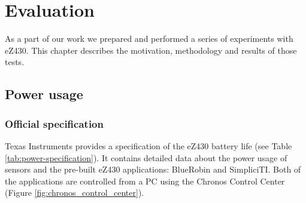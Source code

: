 \chapter{Evaluation}

As a part of our work we prepared and performed a series of experiments with eZ430.
This chapter describes the motivation, methodology and results of those tests.  

\section{Power usage}

\subsection{Official specification}
Texas Instruments provides a specification of the eZ430 battery life (see Table \ref{tab:power-specification}).
It contains detailed data about the power usage of sensors and the pre-built eZ430 applications: BlueRobin and SimpliciTI.
Both of the applications are controlled from a PC using the Chronos Control Center (Figure \ref{fig:chronos_control_center}).

